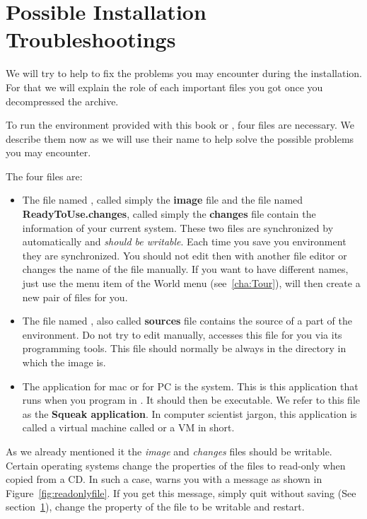  \section{Possible Installation Troubleshootings}

We will try to help to fix the problems you may encounter during the installation. For that we will explain the role of each important files you got once you decompressed the archive.


To run the environment provided with this book or \sq, four files are necessary. We describe them now as we will use their name to help solve the possible problems you may encounter. 

The four files are: 
\begin{itemize}
\item The file named , called simply the \textbf{image} file and the file named \textbf{ReadyToUse.changes}, called simply the \textbf{changes} file contain the information of your current system. These two files are synchronized by \sq automatically and \emph{should be writable}. Each time you save you environment they are synchronized. You should not edit then with another file editor or changes the name of the file manually. If you want to have different names, just use the 
menu item of the World menu (see~\ref{cha:Tour}), \sq will then create a new pair of files for you. 

 
\item The file named , also called \textbf{sources} file contains the source of a part of the \sq environment. Do not try to edit manually, \sq accesses this file for you via its programming tools. This file should normally be always in the directory in which the image is.
  
\item The application \macvm for mac or \pcvm for PC is the \sq system. This is this application that runs when you program in \sq. It should then be executable. 
We refer to this file as the \textbf{Squeak application}. In computer scientist jargon, this application is called a  virtual machine called or  a VM  in short. 
\end{itemize}


As we already mentioned it the \textit{image} and \textit{changes} files should be writable. Certain operating systems change the properties of the files to read-only when copied from a CD. In such a case, \sq warns you with a message as shown in Figure~\ref{fig:readonlyfile}. If you get this message, simply quit \sq without saving (See section~\ref{}), change the property of the file to be writable and restart.  

